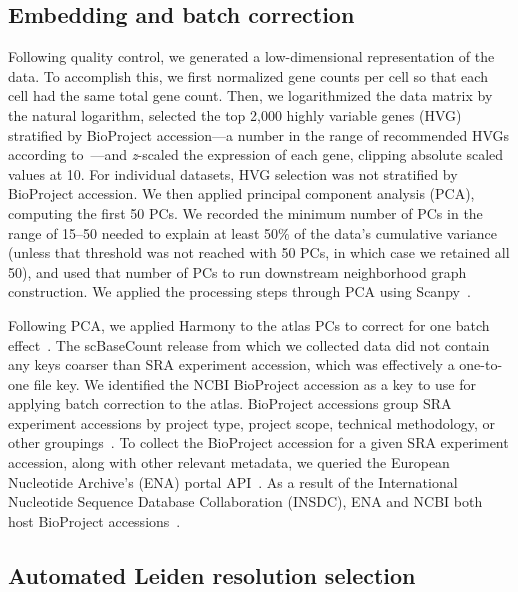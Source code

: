 \documentclass[10pt,letterpaper]{article}
\begin{document}
\subsection*{Embedding and batch correction}
Following quality control, we generated a low-dimensional representation of the data. To accomplish this, we first normalized gene counts per cell so that each cell had the same total gene count. Then, we logarithmized the data matrix by the natural logarithm, selected the top 2,000 highly variable genes (HVG) stratified by BioProject accession---a number in the range of recommended HVGs according to~\textcite{lueckenCurrentBestPractices2019}---and \textit{z}-scaled the expression of each gene, clipping absolute scaled values at 10. For individual datasets, HVG selection was not stratified by BioProject accession. We then applied principal component analysis (PCA), computing the first 50 PCs. We recorded the minimum number of PCs in the range of 15--50 needed to explain at least 50\% of the data's cumulative variance (unless that threshold was not reached with 50 PCs, in which case we retained all 50), and used that number of PCs to run downstream neighborhood graph construction. We applied the processing steps through PCA using Scanpy~\parencite{wolfSCANPYLargescaleSinglecell2018}.

Following PCA, we applied Harmony to the atlas PCs to correct for one batch effect~\parencite{korsunskyFastSensitiveAccurate2019}. The scBaseCount release from which we collected data did not contain any keys coarser than SRA experiment accession, which was effectively a one-to-one file key. We identified the NCBI BioProject accession as a key to use for applying batch correction to the atlas. BioProject accessions group SRA experiment accessions by project type, project scope, technical methodology, or other groupings~\parencite{barrettBioProjectBioSampleDatabases2012}. To collect the BioProject accession for a given SRA experiment accession, along with other relevant metadata, we queried the European Nucleotide Archive's (ENA) portal API~\parencite{amidEuropeanNucleotideArchive2020}. As a result of the International Nucleotide Sequence Database Collaboration (INSDC), ENA and NCBI both host BioProject accessions~\parencite{aritaInternationalNucleotideSequence2021}.

\subsection*{Automated Leiden resolution selection}
\end{document}
